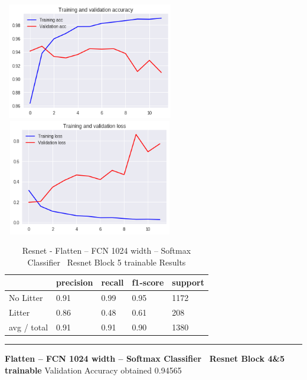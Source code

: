 \documentclass{IEEEtran}
\begin{document}
\includegraphics[width=3in,height=2in]{resnet-img/resnet-img011.png} 
\includegraphics[width=3in,height=2in]{resnet-img/resnet-img012.png} 


\bigskip

\begin{table}[ht]
\centering
\caption{Resnet - Flatten -- FCN 1024 width -- Softmax Classifier \ Resnet Block 5 trainable Results}
\begin{tabular}{|l|l|l|l|l|} 
\hline
 & precision & recall  & f1-score  & support \\\hline
No Litter  &
0.91  &
0.99  &
0.95  &
1172 \\\hline
Litter  &
0.86  &
0.48  &
0.61  &
208 \\\hline
avg / total  &
0.91  &
0.91  &
0.90  &
1380\\\hline
\end{tabular}
\end{table}

\begin{center}\noindent\rule{8cm}{0.4pt}\end{center}


\bigskip

\textbf{Flatten -- FCN 1024 width -- Softmax Classifier \ Resnet Block 4\&5 trainable}
Validation Accuracy obtained 0.94565
\end{document}
